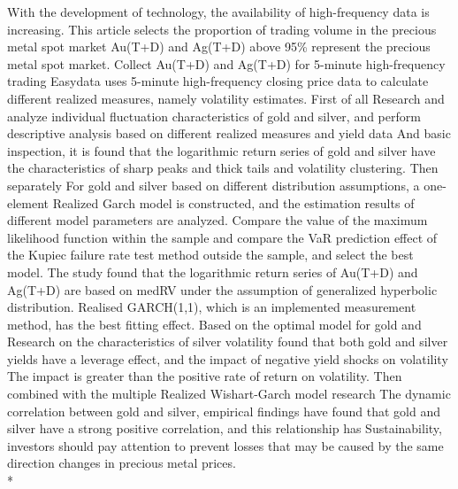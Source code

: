 \begin{eabstract}
With the development of technology, the availability of high-frequency data is
increasing. This article selects the proportion of trading volume in the
precious metal spot market Au(T+D) and Ag(T+D) above 95\% represent the precious
metal spot market. Collect Au(T+D) and Ag(T+D) for 5-minute high-frequency
trading Easydata uses 5-minute high-frequency closing price data to calculate
different realized measures, namely volatility estimates. First of all Research
and analyze individual fluctuation characteristics of gold and silver, and
perform descriptive analysis based on different realized measures and yield data
And basic inspection, it is found that the logarithmic return series of gold and
silver have the characteristics of sharp peaks and thick tails and volatility
clustering. Then separately For gold and silver based on different distribution
assumptions, a one-element Realized Garch model is constructed, and the
estimation results of different model parameters are analyzed. Compare the value
of the maximum likelihood function within the sample and compare the VaR
prediction effect of the Kupiec failure rate test method outside the sample, and
select the best model. The study found that the logarithmic return series of
Au(T+D) and Ag(T+D) are based on medRV under the assumption of generalized
hyperbolic distribution. Realised GARCH(1,1), which is an implemented
measurement method, has the best fitting effect. Based on the optimal model for
gold and Research on the characteristics of silver volatility found that both
gold and silver yields have a leverage effect, and the impact of negative yield
shocks on volatility The impact is greater than the positive rate of return on
volatility. Then combined with the multiple Realized Wishart-Garch model
research The dynamic correlation between gold and silver, empirical findings
have found that gold and silver have a strong positive correlation, and this
relationship has Sustainability, investors should pay attention to prevent
losses that may be caused by the same direction changes in precious metal
prices.
  \\*

\end{eabstract}



